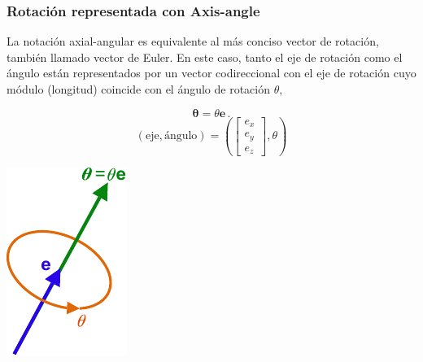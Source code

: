 \begin{frame}
    \frametitle{Rotación representada con Axis-angle}
    La notación axial-angular es equivalente al más conciso vector de rotación, también llamado vector de Euler. En este caso, tanto el eje de rotación como el ángulo están representados por un vector codireccional con el eje de rotación cuyo módulo (longitud) coincide con el ángulo de rotación $\theta$,
    \begin{center}
        \begin{minipage}{0.38\linewidth}
            \small
            \begin{equation*}
                {\displaystyle {\boldsymbol {\theta }}=\theta \mathbf {e} \,.}
            \end{equation*}
            \begin{equation*}
                {\displaystyle (\mathrm {eje} ,\mathrm {\text{ángulo}} )=\left({\begin{bmatrix}e_{x}\\e_{y}\\e_{z}\end{bmatrix}},\theta \right)}
            \end{equation*}
        \end{minipage}
        \hspace{1em}
        \begin{minipage}{0.38\linewidth}
            \centering
            \includegraphics[width=0.5\columnwidth]{images/axis_angle_vector.pdf}
        \end{minipage}
    \end{center}


\end{frame}
